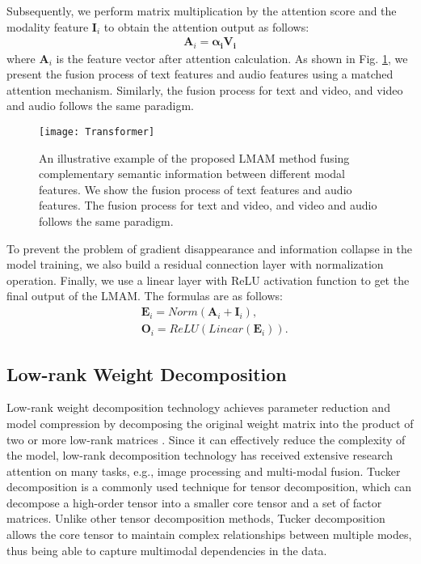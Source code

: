 {{Subsequently, we perform matrix multiplication by the attention score and the modality feature $\boldsymbol{I}_i$ to obtain the attention output as follows:
\begin{equation}
	\begin{aligned}
	\boldsymbol{A}_i =\boldsymbol{\alpha_i\boldsymbol{V}_i}
	\end{aligned}
\end{equation}
{where {$\boldsymbol{A}_i$} is the feature vector after attention calculation. As shown in Fig. \ref{fig:transformer}, we present the fusion process of text features and audio features using a matched attention mechanism. Similarly, the fusion process for text and video, and video and audio follows the same paradigm.}

\begin{figure}
	\centering
	\texttt{[image: Transformer]}
	\caption{An illustrative example of the proposed LMAM method fusing complementary semantic information between different modal features. We show the fusion process of text features and audio features. The fusion process for text and video, and video and audio follows the same paradigm.}
	\label{fig:transformer}
\end{figure}

{To prevent the problem of gradient disappearance and information collapse in the model training, we also build a residual connection layer with normalization operation. Finally, we use a linear layer with ReLU activation function to get the final output of the LMAM. The formulas are as follows:}
\begin{equation}
\begin{aligned}
	&\boldsymbol{E}_i = Norm(\boldsymbol{A}_i + \boldsymbol{I}_i), \\
	&\boldsymbol{O}_i = ReLU(Linear(\boldsymbol{E}_i)).
 \end{aligned}
\end{equation}

\subsection{Low-rank Weight Decomposition}

Low-rank weight decomposition technology achieves parameter reduction and model compression by decomposing the original weight matrix into the product of two or more low-rank matrices \cite{kolda2009tensor}. Since it can effectively reduce the complexity of the model, low-rank decomposition technology has received extensive research attention on many tasks, e.g., image processing and multi-modal fusion. {Tucker decomposition is a commonly used technique for tensor decomposition, which can decompose a high-order tensor into a smaller core tensor and a set of factor matrices. Unlike other tensor decomposition methods, Tucker decomposition allows the core tensor to maintain complex relationships between multiple modes, thus being able to capture multimodal dependencies in the data.}

}}
